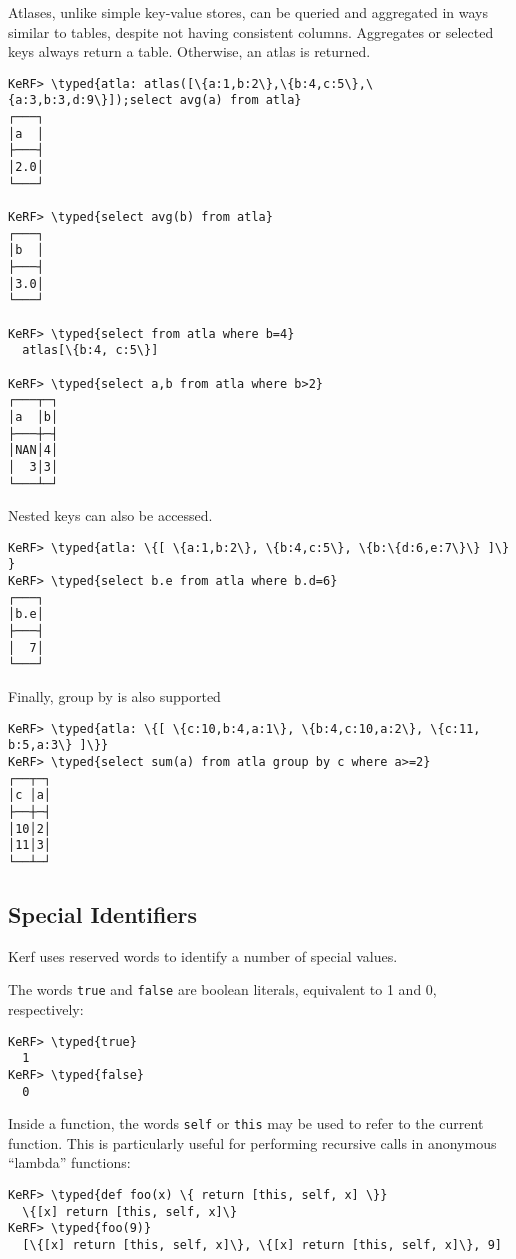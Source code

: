 \documentclass{article}
\newcommand{\typed}[1]{\textcolor{TealBlue}{#1}}
\begin{document}
\pagebreak

Atlases, unlike simple key-value stores, can be queried and aggregated in ways similar to tables, despite not having consistent columns. Aggregates or selected keys always return a table. Otherwise, an atlas is returned.

\begin{Verbatim}
KeRF> \typed{atla: atlas([\{a:1,b:2\},\{b:4,c:5\},\{a:3,b:3,d:9\}]);select avg(a) from atla}
┌───┐
│a  │
├───┤
│2.0│
└───┘

KeRF> \typed{select avg(b) from atla}
┌───┐
│b  │
├───┤
│3.0│
└───┘

KeRF> \typed{select from atla where b=4}
  atlas[\{b:4, c:5\}]

KeRF> \typed{select a,b from atla where b>2}
┌───┬─┐
│a  │b│
├───┼─┤
│NAN│4│
│  3│3│
└───┴─┘

\end{Verbatim}

Nested keys can also be accessed.

\begin{Verbatim}
KeRF> \typed{atla: \{[ \{a:1,b:2\}, \{b:4,c:5\}, \{b:\{d:6,e:7\}\} ]\} }
KeRF> \typed{select b.e from atla where b.d=6}
┌───┐
│b.e│
├───┤
│  7│
└───┘
\end{Verbatim}

Finally, group by is also supported

\begin{Verbatim}
KeRF> \typed{atla: \{[ \{c:10,b:4,a:1\}, \{b:4,c:10,a:2\}, \{c:11, b:5,a:3\} ]\}}
KeRF> \typed{select sum(a) from atla group by c where a>=2}
┌──┬─┐
│c │a│
├──┼─┤
│10│2│
│11│3│
└──┴─┘
\end{Verbatim}

\pagebreak
\subsection{Special Identifiers}
Kerf uses reserved words to identify a number of special values.

\vspace{0.5cm}

The words \texttt{true} and \texttt{false} are boolean literals, equivalent to 1 and 0, respectively:
\begin{Verbatim}
KeRF> \typed{true}
  1
KeRF> \typed{false}
  0
\end{Verbatim}

Inside a function, the words \texttt{self} or \texttt{this} may be used to refer to the current function. This is particularly useful for performing recursive calls in anonymous ``lambda'' functions:
\begin{Verbatim}
KeRF> \typed{def foo(x) \{ return [this, self, x] \}}
  \{[x] return [this, self, x]\}
KeRF> \typed{foo(9)}
  [\{[x] return [this, self, x]\}, \{[x] return [this, self, x]\}, 9]
\end{Verbatim}
\end{document}
